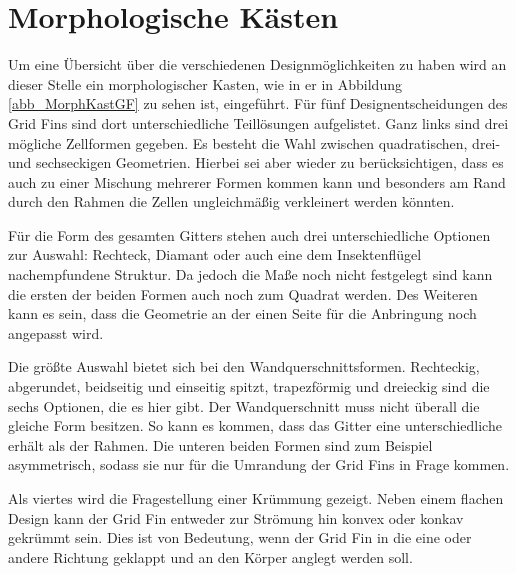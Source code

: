 \section{Morphologische Kästen}
Um eine Übersicht über die verschiedenen Designmöglichkeiten zu haben wird an dieser Stelle ein morphologischer Kasten, wie in er in Abbildung \ref{abb_MorphKastGF} zu sehen ist, eingeführt. Für fünf Designentscheidungen des Grid Fins sind dort unterschiedliche Teillösungen aufgelistet. Ganz links sind drei mögliche Zellformen gegeben. Es besteht die Wahl zwischen quadratischen, drei- und sechseckigen Geometrien. Hierbei sei aber wieder zu berücksichtigen, dass es auch zu einer Mischung mehrerer Formen kommen kann und besonders am Rand durch den Rahmen die Zellen ungleichmäßig verkleinert werden könnten.

Für die Form des gesamten Gitters stehen auch drei unterschiedliche Optionen zur Auswahl: Rechteck, Diamant oder auch eine dem Insektenflügel nachempfundene Struktur. Da jedoch die Maße noch nicht festgelegt sind kann die ersten der beiden Formen auch noch zum Quadrat werden. Des Weiteren kann es sein, dass die Geometrie an der einen Seite für die Anbringung noch angepasst wird.

Die größte Auswahl bietet sich bei den Wandquerschnittsformen. Rechteckig, abgerundet, beidseitig und einseitig spitzt, trapezförmig und dreieckig sind die sechs Optionen, die es hier gibt. Der Wandquerschnitt muss nicht überall die gleiche Form besitzen. So kann es kommen, dass das Gitter eine unterschiedliche erhält als der Rahmen. Die unteren beiden Formen sind zum Beispiel asymmetrisch, sodass sie nur für die Umrandung der Grid Fins in Frage kommen.

Als viertes wird die Fragestellung einer Krümmung gezeigt. Neben einem flachen Design kann der Grid Fin entweder zur Strömung hin konvex oder konkav gekrümmt sein. Dies ist von Bedeutung, wenn der Grid Fin in die eine oder andere Richtung geklappt und an den Körper anglegt werden soll.

